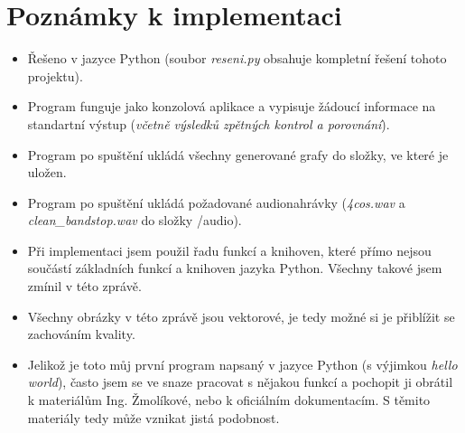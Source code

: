 \documentclass[10pt,a4paper,twocolumn]{article}
\begin{document}
	\section{Poznámky k implementaci}
	\begin{itemize}
		\item Řešeno v jazyce Python (soubor \textit{reseni.py} obsahuje kompletní řešení tohoto projektu).
		\item Program funguje jako konzolová aplikace a vypisuje žádoucí informace na standartní výstup (\textit{včetně výsledků zpětných kontrol a porovnání}).
		\item Program po spuštění ukládá všechny generované grafy do složky, ve které je uložen.
		\item Program po spuštění ukládá požadované audionahrávky (\textit{4cos.wav} a \textit{clean\_bandstop.wav} do složky /audio).
		\item Při implementaci jsem použil řadu funkcí a knihoven, které přímo nejsou součástí základních funkcí a knihoven jazyka Python. Všechny takové jsem zmínil v této zprávě.
		\item Všechny obrázky v této zprávě jsou vektorové, je tedy možné si je přiblížit se zachováním kvality.
		\item Jelikož je toto můj první program napsaný v jazyce Python (s výjimkou \textit{hello world}), často jsem se ve snaze pracovat s nějakou funkcí a pochopit ji obrátil k materiálům Ing. Žmolíkové, nebo k oficiálním dokumentacím. S těmito materiály tedy může vznikat jistá podobnost.
	\end{itemize}
\end{document}
